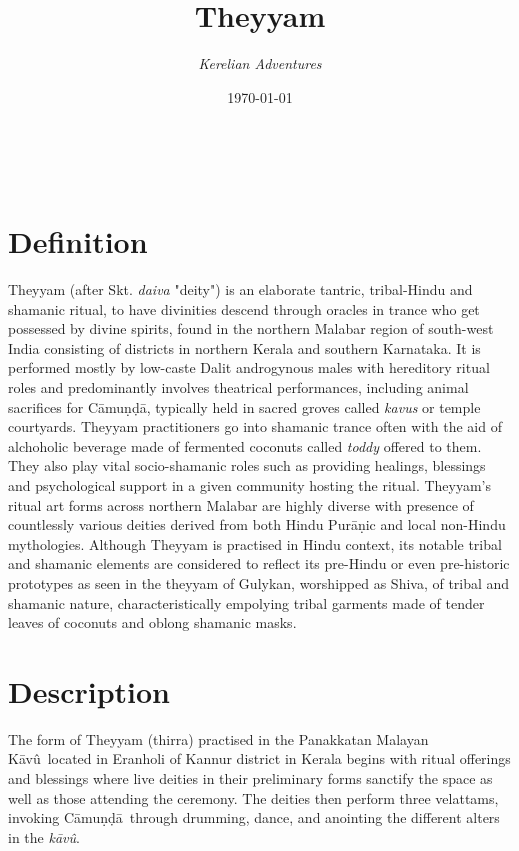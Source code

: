 \documentclass[a4paper, 11pt]{article} %
\title{\textbf{Theyyam}} %
\author{\textit{Kerelian Adventures}} %
\date{\today} %
\makeatletter
\newcommand{\camunda}[0]{C\={a}mu\d{n}\d{d}\={a}}
\newcommand{\kavu}[0]{\textit{k\={a}v\^{u}}}
\newcommand{\Kavu}[0]{K\={a}v\^{u}}
\renewcommand{\maketitle}{ %
\begin{flushright} %
{\LARGE\@title} %

\vspace{10pt} %

{\@author} %
\\\@date %

\vspace{30pt} %
\end{flushright}
}
\makeatother
\begin{document}
\maketitle %

\thispagestyle{empty}


\section{Definition}
  \label{sec:Definition}

Theyyam (after Skt. \textit{daiva} "deity") is an elaborate tantric, tribal-Hindu and shamanic ritual, to have divinities descend through oracles in trance who get possessed by divine spirits, found in the northern Malabar region of south-west India consisting of districts in northern Kerala and southern Karnataka. It is performed mostly by low-caste Dalit androgynous males with hereditory ritual roles and predominantly involves theatrical performances, including animal sacrifices for Cāmuṇḍā, typically held in sacred groves called \textit{kavus} or temple courtyards. Theyyam practitioners go into shamanic trance often with the aid of alchoholic beverage made of fermented coconuts called \textit{toddy} offered to them. They also play vital socio-shamanic roles such as providing healings, blessings and psychological support in a given community hosting the ritual. Theyyam's ritual art forms across northern Malabar are highly diverse with presence of countlessly various deities derived from both Hindu Purāṇic and local non-Hindu mythologies. Although Theyyam is practised in Hindu context, its notable tribal and shamanic elements are considered to reflect its pre-Hindu or even pre-historic prototypes as seen in the theyyam of Gulykan, worshipped as Shiva, of tribal and shamanic nature, characteristically empolying tribal garments made of tender leaves of coconuts and oblong shamanic masks.

\section{Description}%
  \label{sec:Description}
  
The form of Theyyam (thirra) practised in the Panakkatan Malayan \Kavu\ located in Eranholi of Kannur district in Kerala begins with ritual offerings and blessings where live deities in their preliminary forms sanctify the space as well as those attending the ceremony.
The deities then perform three velattams, invoking \camunda\ through drumming, dance, and anointing the different alters in the \kavu.
\end{document}
